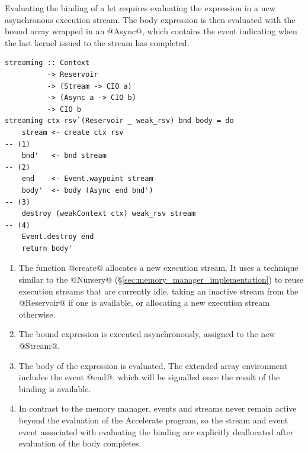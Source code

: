 Evaluating the binding of a let requires evaluating the expression in a new
asynchronous execution stream. The body expression is then evaluated with the
bound array wrapped in an @Async@, which contains the event indicating when the
last kernel issued to the stream has completed.
%
\begin{lstlisting}[style=haskell]
streaming :: Context
          -> Reservoir
          -> (Stream -> CIO a)
          -> (Async a -> CIO b)
          -> CIO b
streaming ctx rsv`(Reservoir _ weak_rsv) bnd body = do
    stream <- create ctx rsv                                                       -- (1)
    bnd'   <- bnd stream                                                           -- (2)
    end    <- Event.waypoint stream
    body'  <- body (Async end bnd')                                                -- (3)
    destroy (weakContext ctx) weak_rsv stream                                      -- (4)
    Event.destroy end
    return body'
\end{lstlisting}
%
\begin{enumerate}
\item The function @create@ allocates a new execution stream. It uses a
    technique similar to the @Nursery@
    (\S\ref{sec:memory_manager_implementation}) to reuse execution streams that
    are currently idle, taking an inactive stream from the @Reservoir@ if one is
    available, or allocating a new execution stream otherwise.
%

\item The bound expression is executed asynchronously, assigned to the new
    @Stream@.

\item The body of the expression is evaluated. The extended array environment
    includes the event @end@, which will be signalled once the result of the
    binding is available.

\item In contrast to the memory manager, events and streams never remain active
    beyond the evaluation of the Accelerate program, so the stream and event
    event associated with evaluating the binding are explicitly deallocated
    after evaluation of the body completes.

\end{enumerate}

